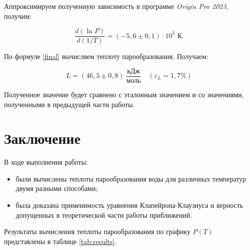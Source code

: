 \documentclass[a4paper, 12pt]{article}
\begin{document}
    \noindent Аппроксимируем полученную зависимость в программе \textit{Origin Pro 2023}, получим:
    
    \[ \frac{d(\ln P)}{d(1/T)} = \left(-5,6\pm 0,1\right) \cdot 10^{3} \text{ К}.\]

    \noindent По формуле \eqref{final} вычисляем теплоту парообразования. Получаем:
    
    \[ \boxed{L = \left(46,5 \pm 0,8\right) \: \frac{\text{кДж}}{\text{моль}} \quad \left( \varepsilon_L = 1,7 \% \right)} \]

    \noindent Полученное значение будет сравнено с эталонным значением и со значениями, полученными в предыдущей части работы.
    
    \section*{Заключение}
    
    \noindent В ходе выполнения работы:

    \begin{itemize}
        \item были вычислены теплоты парообразования воды для различных температур двумя разными способами;
        \item была доказана применимость уравнения Клапейрона-Клаузиуса и верность допущенных в теоретической части работы приближений.
    \end{itemize}

    \noindent Результаты вычисления теплоты парообразования по графику $P(T)$ представлены в таблице \ref{tab:results}.
\end{document}
